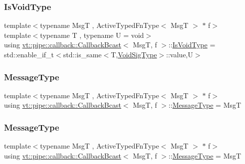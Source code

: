 \subsubsection{\texorpdfstring{Is\+Void\+Type}{IsVoidType}}
{\footnotesize\ttfamily template$<$typename MsgT , Active\+Typed\+Fn\+Type$<$ Msg\+T $>$ $\ast$ f$>$ \\
template$<$typename T , typename U  = void$>$ \\
using \hyperlink{structvt_1_1pipe_1_1callback_1_1_callback_bcast}{vt\+::pipe\+::callback\+::\+Callback\+Bcast}$<$ MsgT, f $>$\+::\hyperlink{structvt_1_1pipe_1_1callback_1_1_callback_bcast_a3ca08c23824cfac76b837311a1d2c929}{Is\+Void\+Type} =  std\+::enable\+\_\+if\+\_\+t$<$std\+::is\+\_\+same$<$T,\hyperlink{structvt_1_1pipe_1_1callback_1_1_callback_bcast_a64032b57b71c27653b93b3e13bf38145}{Void\+Sig\+Type}$>$\+::value,U$>$}

\mbox{\label{structvt_1_1pipe_1_1callback_1_1_callback_bcast_a71dc6da3c022c5fe989265da28bedec6}} 
\subsubsection{\texorpdfstring{Message\+Type}{MessageType}\hspace{0.1cm}{\footnotesize\ttfamily [1/2]}}
{\footnotesize\ttfamily template$<$typename MsgT , Active\+Typed\+Fn\+Type$<$ Msg\+T $>$ $\ast$ f$>$ \\
using \hyperlink{structvt_1_1pipe_1_1callback_1_1_callback_bcast}{vt\+::pipe\+::callback\+::\+Callback\+Bcast}$<$ MsgT, f $>$\+::\hyperlink{structvt_1_1pipe_1_1callback_1_1_callback_bcast_a71dc6da3c022c5fe989265da28bedec6}{Message\+Type} =  MsgT}

\mbox{\label{structvt_1_1pipe_1_1callback_1_1_callback_bcast_a71dc6da3c022c5fe989265da28bedec6}} 
\subsubsection{\texorpdfstring{Message\+Type}{MessageType}\hspace{0.1cm}{\footnotesize\ttfamily [2/2]}}
{\footnotesize\ttfamily template$<$typename MsgT , Active\+Typed\+Fn\+Type$<$ Msg\+T $>$ $\ast$ f$>$ \\
using \hyperlink{structvt_1_1pipe_1_1callback_1_1_callback_bcast}{vt\+::pipe\+::callback\+::\+Callback\+Bcast}$<$ MsgT, f $>$\+::\hyperlink{structvt_1_1pipe_1_1callback_1_1_callback_bcast_a71dc6da3c022c5fe989265da28bedec6}{Message\+Type} =  MsgT}

